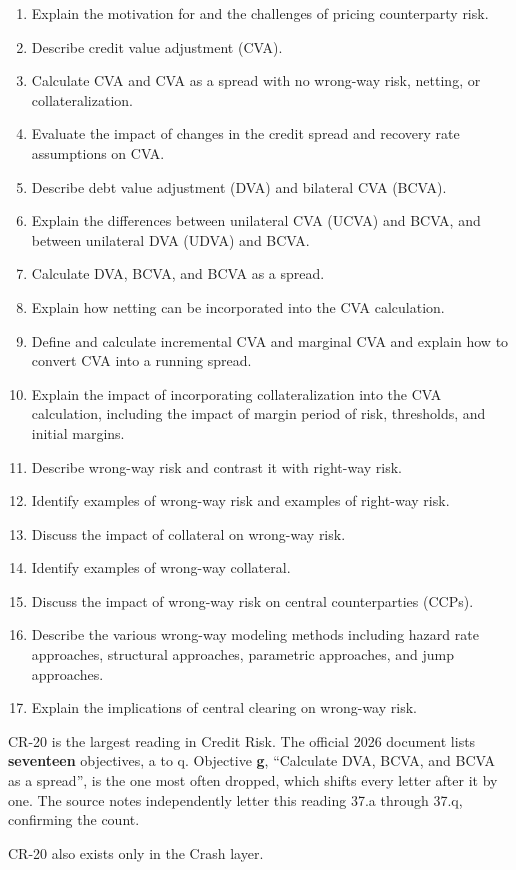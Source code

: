 
\begin{crkeybox}
\begin{enumerate}[label=\textbf{\alph*.},leftmargin=2em]
\item Explain the motivation for and the challenges of pricing counterparty risk.
\item Describe credit value adjustment (CVA).
\item Calculate CVA and CVA as a spread with no wrong-way risk, netting, or collateralization.
\item Evaluate the impact of changes in the credit spread and recovery rate assumptions on CVA.
\item Describe debt value adjustment (DVA) and bilateral CVA (BCVA).
\item Explain the differences between unilateral CVA (UCVA) and BCVA, and between unilateral DVA (UDVA) and BCVA.
\item Calculate DVA, BCVA, and BCVA as a spread.
\item Explain how netting can be incorporated into the CVA calculation.
\item Define and calculate incremental CVA and marginal CVA and explain how to convert CVA into a running spread.
\item Explain the impact of incorporating collateralization into the CVA calculation, including the impact of margin period of risk, thresholds, and initial margins.
\item Describe wrong-way risk and contrast it with right-way risk.
\item Identify examples of wrong-way risk and examples of right-way risk.
\item Discuss the impact of collateral on wrong-way risk.
\item Identify examples of wrong-way collateral.
\item Discuss the impact of wrong-way risk on central counterparties (CCPs).
\item Describe the various wrong-way modeling methods including hazard rate approaches, structural approaches, parametric approaches, and jump approaches.
\item Explain the implications of central clearing on wrong-way risk.
\end{enumerate}
\end{crkeybox}

\begin{crtrapbox}
CR-20 is the largest reading in Credit Risk. The official 2026 document lists
\textbf{seventeen} objectives, a to q. Objective \textbf{g}, ``Calculate DVA,
BCVA, and BCVA as a spread'', is the one most often dropped, which shifts every
letter after it by one. The source notes independently letter this reading 37.a
through 37.q, confirming the count.

\smallskip
CR-20 also exists only in the Crash layer.
\end{crtrapbox}

